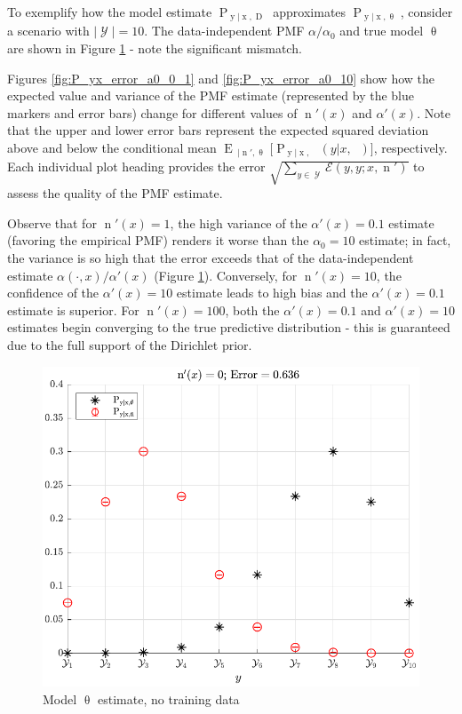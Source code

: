 \documentclass[conference]{IEEEtran}
\DeclareMathOperator{\xrm}{\mathrm{x}}
\DeclareMathOperator{\yrm}{\mathrm{y}}
\DeclareMathOperator{\Drm}{\mathrm{D}}
\DeclareMathOperator{\nrm}{\mathrm{n}}
\DeclareMathOperator{\nbarrm}{\bar{\mathrm{n}}}
\DeclareMathOperator{\Prm}{\mathrm{P}}
\DeclareMathOperator{\Erm}{\mathrm{E}}
\DeclareMathOperator{\Ycal}{\mathcal{Y}}
\begin{document}
To exemplify how the model estimate $\Prm_{\yrm | \xrm,\Drm}$ approximates $\Prm_{\yrm | \xrm,\uptheta}$, consider a scenario with $|\Ycal| = 10$. The data-independent PMF $\alpha / \alpha_0$ and true model $\uptheta$ are shown in Figure \ref{fig:P_yx_error_N_0} - note the significant mismatch. 

Figures \ref{fig:P_yx_error_a0_0_1} and \ref{fig:P_yx_error_a0_10} show how the expected value and variance of the PMF estimate (represented by the blue markers and error bars) change for different values of $\nrm'(x)$ and $\alpha'(x)$. Note that the upper and lower error bars represent the expected squared deviation above and below the conditional mean $\Erm_{\nbarrm | \nrm',\uptheta}\big[ \Prm_{\yrm | \xrm,\nbarrm}(y | x,\nbarrm) \big]$, respectively. Each individual plot heading provides the error $\sqrt{\sum_{y \in \Ycal} \mathcal{E}(y,y ; x,\nrm')}$ to assess the quality of the PMF estimate. 

Observe that for $\nrm'(x) = 1$, the high variance of the $\alpha'(x) = 0.1$ estimate (favoring the empirical PMF) renders it worse than the $\alpha_0 = 10$ estimate; in fact, the variance is so high that the error exceeds that of the data-independent estimate $\alpha(\cdot,x) / \alpha'(x)$ (Figure \ref{fig:P_yx_error_N_0}). Conversely, for $\nrm'(x) = 10$, the confidence of the $\alpha'(x) = 10$ estimate leads to high bias and the $\alpha'(x) = 0.1$ estimate is superior. For $\nrm'(x) = 100$, both the $\alpha'(x) = 0.1$ and $\alpha'(x) = 10$ estimates begin converging to the true predictive distribution - this is guaranteed due to the full support of the Dirichlet prior.


\begin{figure}
\centering
\includegraphics[width=1\linewidth]{P_yx_error_N_0.pdf}
\caption{Model $\uptheta$ estimate, no training data}
\label{fig:P_yx_error_N_0}
\end{figure}
\end{document}

